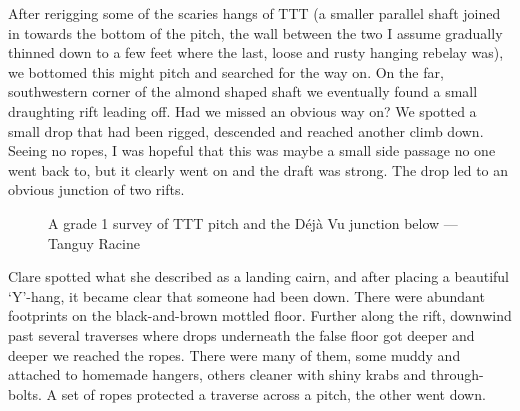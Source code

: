 After rerigging some of the scaries hangs of TTT (a smaller parallel shaft joined in towards the bottom of the pitch, the wall between the two I assume gradually thinned down to a few feet where the last, loose and rusty hanging rebelay was), we bottomed this might pitch and searched for the way on. On the far, southwestern corner of the almond shaped shaft  we eventually found a small draughting rift leading off. Had we missed an obvious way on? We spotted a small drop that had been rigged, descended and reached another climb down. Seeing no ropes, I was hopeful that this was maybe a small side passage no one went back to, but it clearly went on and the draft was strong. The drop led to an obvious junction of two rifts.

\begin{figure}[t]
\checkoddpage \ifoddpage \forcerectofloat \else \forceversofloat \fi
\centering
{}
\caption{A grade 1 survey of TTT pitch and the Déjà Vu junction below --- Tanguy Racine}
\label{Grade 1 survey}
\end{figure}

Clare spotted what she described as a landing cairn, and after placing a beautiful ‘Y’-hang, it became clear that someone had been down. There were abundant footprints on the black-and-brown mottled floor. Further along the rift, downwind past several traverses where drops underneath the false floor got deeper and deeper we reached the ropes. There were many of them, some muddy and attached to homemade hangers, others cleaner with shiny krabs and through-bolts. A set of ropes protected a traverse across a pitch, the other went down.

